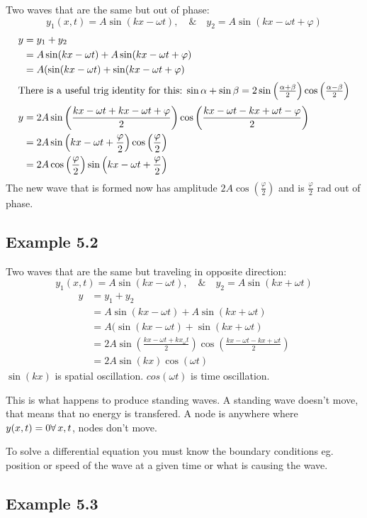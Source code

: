 Two waves that are the same but out of phase:
\[y_1(x,t)=A\sin(kx-\omega t),\quad\&\quad y_2=A\sin(kx-\omega t+\varphi)\]
\begin{align*}
y&=y_1+y_2\\
&=A\sin(kx-\omega t)+A\sin(kx-\omega t+\varphi)\\
&=A(\sin(kx-\omega t)+\sin(kx-\omega t+\varphi)\\
\intertext{There is a useful trig identity for this: \(\sin\alpha+\sin\beta=2\sin\left(\frac{\alpha+\beta}{2}\right)\cos\left(\frac{\alpha-\beta}{2}\right)\)}
y&=2A\sin\left(\frac{kx-\omega t+kx-\omega t+\varphi}{2}\right)\cos\left(\frac{kx-\omega t-kx+\omega t-\varphi}{2}\right)\\
&=2A\sin\left(kx-\omega t+\frac{\varphi}{2}\right)\cos\left(\frac{\varphi}{2}\right)\\
&=2A\cos\left(\frac{\varphi}{2}\right)\sin\left(kx-\omega t+\frac{\varphi}{2}\right)
\end{align*}
The new wave that is formed now has amplitude \(2A\cos\left(\frac{\varphi}{2}\right)\) and is \(\frac{\varphi}{2}\) \si{rad} out of phase.

\subsection*{Example 5.2}

Two waves that are the same but traveling in opposite direction:
\[y_1(x,t)=A\sin(kx-\omega t),\quad\&\quad y_2=A\sin(kx+\omega t)\]
\begin{align*}
y&=y_1+y_2\\
&=A\sin(kx-\omega t)+A\sin(kx+\omega t)\\
&=A(\sin(kx-\omega t)+\sin(kx+\omega t)\\
&=2A\sin\left(\frac{kx-\omega t+kx_\omega t}{2}\right)\cos\left(\frac{kx-\omega t-kx+\omega t}{2}\right)\\
&=2A\sin(kx)\cos(\omega t)
\end{align*}
\(\sin(kx)\) is spatial oscillation. \(cos(\omega t)\) is time oscillation.

This is what happens to produce standing waves. A standing wave doesn't move, that means that no energy is transfered. A node is anywhere where \(y(x,t)=0\forall\, x,t\), nodes don't move.

To solve a differential equation you must know the boundary conditions eg. position or speed of the wave at a given time or what is causing the wave. 

\subsection*{Example 5.3}

